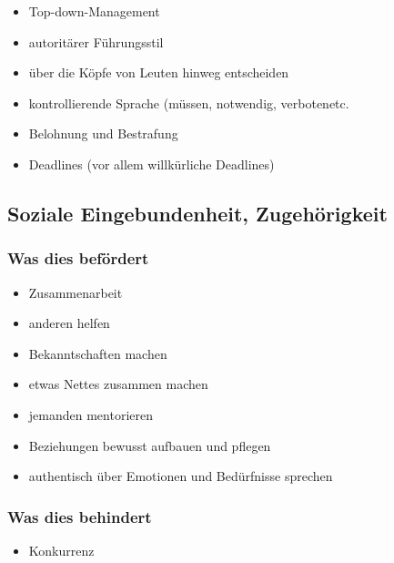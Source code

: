 \begin{itemize}
  \item Top-down-Management
  \item autoritärer Führungsstil 
  \item über die Köpfe von Leuten hinweg entscheiden
  \item kontrollierende Sprache (\glqq müssen\grqq, \glqq notwendig\grqq, \glqq verboten\grqq etc.
  \item Belohnung und Bestrafung
  \item Deadlines (vor allem willkürliche Deadlines) 
\end{itemize}



\subsection{Soziale Eingebundenheit, Zugehörigkeit}


\subsubsection{Was dies befördert}

\begin{itemize}
  \item Zusammenarbeit
  \item anderen helfen
  \item Bekanntschaften machen
  \item etwas Nettes zusammen machen
  \item jemanden mentorieren
  \item Beziehungen bewusst aufbauen und pflegen
  \item authentisch über Emotionen und Bedürfnisse sprechen
\end{itemize}

\subsubsection{Was dies behindert}

\begin{itemize}
  \item Konkurrenz
\end{itemize}
